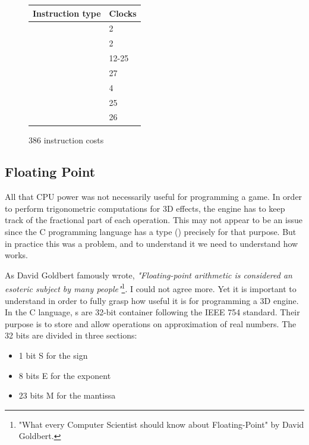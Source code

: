 \documentclass[book.tex]{subfiles}
\begin{document}
  \begin{figure}[H]
\centering  
\begin{tabularx}{\textwidth}{ X  Y }
  \toprule
  \textbf{Instruction type} &  \textbf{Clocks} \\
  \toprule 
    & 2  \\
    & 2  \\
    & 12-25\protect\footnotemark  \\
    & 27 \\
    & 4 \\
    & 25 \\
    & 26 \\
  \toprule
\end{tabularx}
\caption{386 instruction costs\protect\footnotemark}
\end{figure}
\addtocounter{footnote}{-1}





  \subsection{Floating Point}
  
   All that CPU power was not necessarily useful for programming a game. In order to perform trigonometric computations for 3D effects, the engine has to keep track of the fractional part of each operation. This may not appear to be an issue since the C programming language has a type () precisely for that purpose. But in practice this was a problem, and to understand it we need to understand how  works.\\
\par
 As David Goldbert famously wrote, \emph{"Floating-point arithmetic is considered an esoteric subject by many people"}\footnote{"What every Computer Scientist should know about Floating-Point" by David Goldbert.}. I could not agree more. Yet it is important to understand in order to fully grasp how useful it is for programming a 3D engine. In the C language, s are 32-bit container following the IEEE 754 standard. Their purpose is to store and allow operations on approximation of real numbers. The 32 bits are divided in three sections:\\
\begin{itemize}
  \item 1 bit S for the sign
  \item 8 bits E for the exponent
  \item 23 bits M for the mantissa
\end{itemize} 
\end{document}
